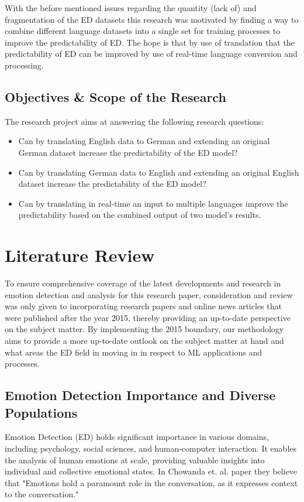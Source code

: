 \documentclass[11pt]{article}
\begin{document}
With the before mentioned issues regarding the quantity (lack of) and fragmentation of the ED datasets this research was motivated by finding a way to combine different language datasets into a single set for training processes to improve the predictability of ED. The hope is that by use of translation that the predictability of ED can be improved by use of real-time language conversion and processing.

\subsection{Objectives \& Scope of the Research}

The research project aims at answering the following research questions:

\begin{itemize}
\item Can by translating English data to German and extending an original German dataset increase the predictability of the ED model?
\item Can by translating German data to English and extending an original English dataset increase the predictability of the ED model?
\item Can by translating in real-time an input to multiple languages improve the predictability based on the combined output of two model's results.
\end{itemize}

\clearpage
\section{Literature Review}
To ensure comprehensive coverage of the latest developments and research in emotion detection and analysis for this research paper, consideration and review was only given to incorporating research papers and online news articles that were published after the year 2015, thereby providing an up-to-date perspective on the subject matter. By implementing the 2015 boundary, our methodology aims to provide a more up-to-date outlook on the subject matter at hand and what areas the ED field in moving in in respect to ML applications and processes.

\subsection{Emotion Detection Importance and Diverse Populations}
Emotion Detection (ED) holds significant importance in various domains, including psychology, social sciences, and human-computer interaction. It enables the analysis of human emotions at scale, providing valuable insights into individual and collective emotional states. In Chowanda et. al. paper\cite{CHOWANDA-2021821} they believe that "Emotions hold a paramount role in the conversation, as it expresses context to the conversation."
\end{document}
